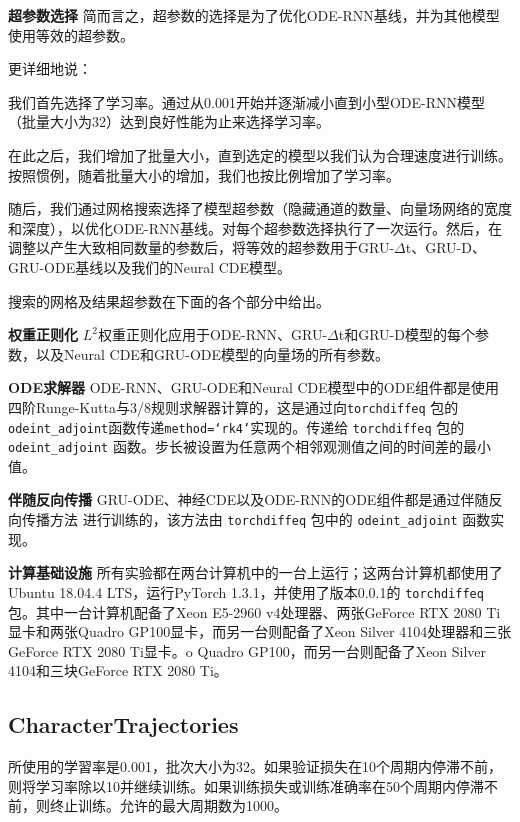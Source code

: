 \documentclass{ctexart}
\theoremstyle{plain}
\theoremstyle{definition}
\newcommand{\boldheading}[1]{

\textbf{#1}\quad}
\begin{document}
	\boldheading{超参数选择}
	简而言之，超参数的选择是为了优化ODE-RNN基线，并为其他模型使用等效的超参数。
	
	更详细地说：
	
	我们首先选择了学习率。通过从0.001开始并逐渐减小直到小型ODE-RNN模型（批量大小为32）达到良好性能为止来选择学习率。
	
 在此之后，我们增加了批量大小，直到选定的模型以我们认为合理速度进行训练。按照惯例，随着批量大小的增加，我们也按比例增加了学习率。
	
 随后，我们通过网格搜索选择了模型超参数（隐藏通道的数量、向量场网络的宽度和深度），以优化ODE-RNN基线。对每个超参数选择执行了一次运行。然后，在调整以产生大致相同数量的参数后，将等效的超参数用于GRU-$\Delta$t、GRU-D、GRU-ODE基线以及我们的Neural CDE模型。
	
 搜索的网格及结果超参数在下面的各个部分中给出。
	
	\boldheading{权重正则化}
	$L^2$权重正则化应用于ODE-RNN、GRU-$\Delta$t和GRU-D模型的每个参数，以及Neural CDE和GRU-ODE模型的向量场的所有参数。
	
	\boldheading{ODE求解器}
	ODE-RNN、GRU-ODE和Neural CDE模型中的ODE组件都是使用四阶Runge-Kutta与3/8规则求解器计算的，这是通过向\texttt{torchdiffeq} \cite{torchdiffeq}包的\texttt{odeint\_adjoint}函数传递\texttt{method=`rk4'}实现的。传递给 \texttt{torchdiffeq} \cite{torchdiffeq} 包的 \texttt{odeint\_adjoint} 函数。步长被设置为任意两个相邻观测值之间的时间差的最小值。

\boldheading{伴随反向传播}
GRU-ODE、神经CDE以及ODE-RNN的ODE组件都是通过伴随反向传播方法 \cite{neural-odes} 进行训练的，该方法由 \texttt{torchdiffeq} 包中的 \texttt{odeint\_adjoint} 函数实现。

\boldheading{计算基础设施}
所有实验都在两台计算机中的一台上运行；这两台计算机都使用了Ubuntu 18.04.4 LTS，运行PyTorch 1.3.1，并使用了版本0.0.1的 \texttt{torchdiffeq} \cite{torchdiffeq} 包。其中一台计算机配备了Xeon E5-2960 v4处理器、两张GeForce RTX 2080 Ti显卡和两张Quadro GP100显卡，而另一台则配备了Xeon Silver 4104处理器和三张GeForce RTX 2080 Ti显卡。o Quadro GP100，而另一台则配备了Xeon Silver 4104和三块GeForce RTX 2080 Ti。

	\subsection{CharacterTrajectories}\label{appendix:uea}
	所使用的学習率是0.001，批次大小为32。如果验证损失在10个周期内停滞不前，则将学习率除以10并继续训练。如果训练损失或训练准确率在50个周期内停滞不前，则终止训练。允许的最大周期数为1000。
	
\end{document}
